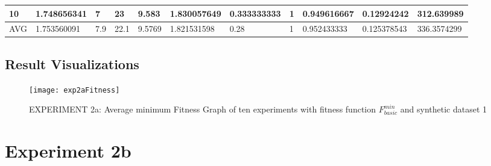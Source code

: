 \begin{table}[H]
\begin{adjustbox}{max width=380pt,keepaspectratio,angle=90}
\begin{tabular}{|l|l|l|l|l|l|l|l|l|l|l|}
					10         & 1.748656341 & 7          & 23         & 9.583      & 1.830057649 & 0.333333333 & 1           & 0.949616667 & 0.12924242  & 312.639989  \\ \hline\hline
					AVG        & 1.753560091 & 7.9        & 22.1       & 9.5769     & 1.821531598 & 0.28        & 1           & 0.952433333 & 0.125378543 & 336.3574299 \\ \hline						
				\end{tabular}
			\end{adjustbox}	
		\end{table}
	\subsection{Result Visualizations}
	\label{sec:A_Exp2a_Diagrams}
		\begin{figure}[H]
			\centering
			\texttt{[image: exp2aFitness]}
			\caption{EXPERIMENT 2a: Average minimum Fitness Graph of ten experiments with fitness function $F_{basic}^{min}$ and synthetic dataset 1}
			\label{fig:exp2afitness}
		\end{figure}
	
\section{Experiment 2b}
\label{sec:A_Exp2b}
